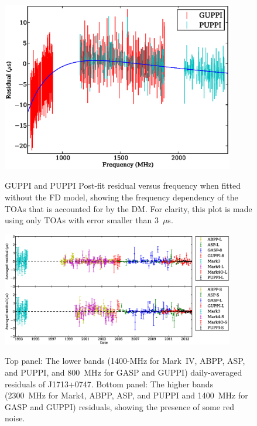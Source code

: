 \documentclass[12pt,preprint]{aastex}
\newcommand{\msR}{\mathscr{R}}
\begin{document}

\begin{figure}
\includegraphics[width=4in]{FD.ps} \\ 
\caption {\label{fig:FD} GUPPI and PUPPI Post-fit residual versus frequency when fitted
without the FD model, showing the frequency dependency of the TOAs that is 
accounted for by the DM. For
clarity, this plot is made using only TOAs with error smaller than 3~$\mu$s.} 
\end{figure} 

\begin{figure}
\includegraphics[width=4in]{residual.eps} \\ 
\caption {\label{fig:res} Top panel: The lower bands (1400-MHz for
Mark~IV, ABPP, ASP, and PUPPI, and 800~MHz for GASP and GUPPI) daily-averaged residuals of
J1713+0747. Bottom panel: The higher bands (2300~MHz for Mark4, ABPP, ASP, and PUPPI and
1400~MHz for GASP and GUPPI) residuals, showing the presence of some red noise.} 
\end{figure} 
\end{document}

